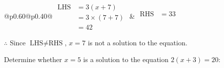 \documentclass[12pt]{article}
\newcounter{minipagecount}
\begin{document}
\begin{multicols}{2}
\begin{minipage}[t]{0.40\textwidth}
    \renewcommand{\arraystretch}{1.3} %
    \begin{tabular}{@{}p{0.60\linewidth}@{}p{0.40\linewidth}@{}}
        \(\begin{aligned}
            \text{LHS} &= 3(x + 7) \\
                    &= 3 \times(7 + 7) \\
                    &= 42
        \end{aligned}\) &
        \(\begin{aligned}
            \text{RHS} &= 33\\
                    & \\
                    &
        \end{aligned}\)
    \end{tabular}
    \renewcommand{\arraystretch}{1.0} %
    \vspace{2pt}  %

    \noindent \(\therefore\) Since \(\text{LHS} \neq \text{RHS}\), \(x = 7\) is not  a solution to the equation.

\end{minipage}

 \vspace*{16pt}
\noindent{(\theminipagecount)}\hspace{0.1mm} %
\begin{minipage}[t]{0.40\textwidth} %

    \noindent Determine whether \(x = 5\) is a solution to the equation \(2(x + 3) = 20\):
    \vspace{4pt}  %

    \noindent


\end{minipage}
\end{multicols}
\end{document}
